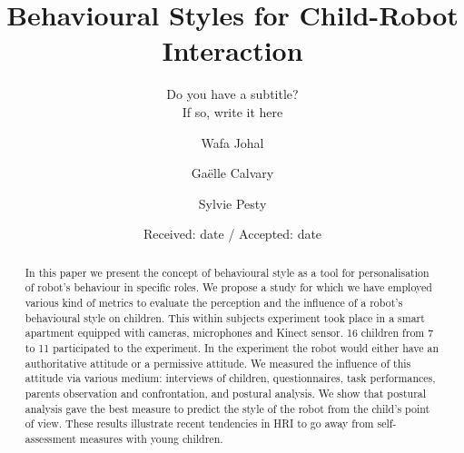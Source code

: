\documentclass[smallextended]{svjour3}
\begin{document}
\title{Behavioural Styles for Child-Robot Interaction%
}
\subtitle{Do you have a subtitle?\\ If so, write it here}


\author{Wafa Johal         \and
        Gaëlle Calvary \and %
        Sylvie Pesty
}



\date{Received: date / Accepted: date}
\maketitle
\begin{abstract}
	In this paper we present the concept of behavioural style as a tool for personalisation of robot's behaviour in specific roles. 
	We propose a study for which we have employed various kind of metrics to evaluate the perception and the influence of a robot's behavioural style on children. 
	This within subjects experiment took place in a smart apartment equipped with cameras, microphones and Kinect sensor. 16 children from 7 to 11 participated to the experiment.
	In the experiment the robot would either have an authoritative attitude or a permissive attitude. 
	We measured the influence of this attitude via various medium:
	interviews of children, questionnaires, task performances, parents observation and confrontation, and postural analysis. 
	We show that postural analysis gave the best measure to predict the style of the robot from the child's point of view.
	These results illustrate recent tendencies in HRI to go away from self-assessment measures with young children.
\end{abstract}
\end{document}
